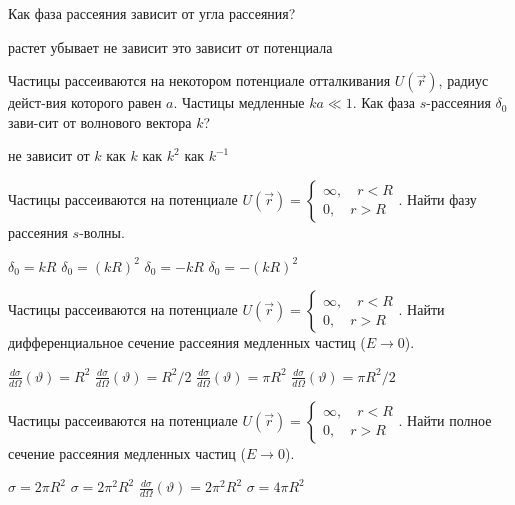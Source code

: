 \documentclass[11pt,a4paper]{exam}
\begin{document}
\begin{questions}
\question Как фаза рассеяния зависит от угла рассеяния?
\begin{choices}
\choice растет      
\choice убывает     
\choice не зависит     
\choice это зависит от потенциала
\end{choices}

\question Частицы рассеиваются на некотором потенциале отталкивания $U(\vec r)$, радиус дейст-вия которого равен $a$. Частицы медленные $ka \ll 1$. Как фаза $s$-рассеяния ${\delta _0}$ зави-сит от волнового вектора $k$?
\begin{choices}
\choice не зависит от $k$    
\choice как $k$  
\choice как ${k^2}$ 
\choice как ${k^{ - 1}}$ 
\end{choices}

\question Частицы рассеиваются на потенциале $U(\vec r) = \left\{ {\begin{array}{*{20}{c}}
{\infty ,\quad r < R}\\
{0,\quad r > R}
\end{array}} \right.$. Найти фазу рассеяния $s$-волны.
\begin{choices}
\choice ${\delta _0} = kR$       
\choice ${\delta _0} = {(kR)^2}$ 
\choice ${\delta _0} =  - kR$ 
\choice ${\delta _0} =  - {(kR)^2}$
\end{choices}

\question Частицы рассеиваются на потенциале $U(\vec r) = \left\{ {\begin{array}{*{20}{c}}
{\infty ,\quad r < R}\\
{0,\quad r > R}
\end{array}} \right.$. Найти дифференциальное сечение рассеяния медленных частиц ($E \to 0$).
\begin{choices}
\choice $\frac{{d\sigma }}{{d\Omega }}\left( \vartheta  \right) = {R^2}$   
\choice $\frac{{d\sigma }}{{d\Omega }}\left( \vartheta  \right) = {R^2}/2$ 
\choice $\frac{{d\sigma }}{{d\Omega }}\left( \vartheta  \right) = \pi {R^2}$  
\choice $\frac{{d\sigma }}{{d\Omega }}\left( \vartheta  \right) = \pi {R^2}/2$
\end{choices}

\question Частицы рассеиваются на потенциале $U(\vec r) = \left\{ {\begin{array}{*{20}{c}}
{\infty ,\quad r < R}\\
{0,\quad r > R}
\end{array}} \right.$. Найти полное сечение рассеяния медленных частиц ($E \to 0$).
\begin{choices}
\choice $\sigma  = 2\pi {R^2}$      
\choice $\sigma  = 2{\pi ^2}{R^2}$     
\choice $\frac{{d\sigma }}{{d\Omega }}\left( \vartheta  \right) = 2{\pi ^2}{R^2}$   
\choice $\sigma  = 4\pi {R^2}$
\end{choices}


\end{questions}
\end{document}
